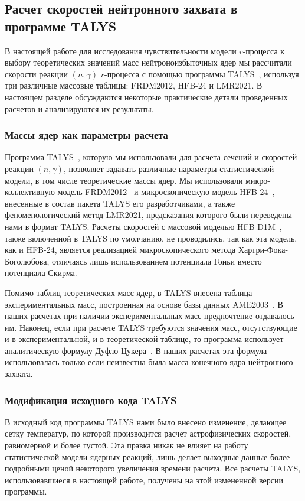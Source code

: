 \subsection{Расчет скоростей нейтронного захвата в программе TALYS}
В настоящей работе для исследования чувствительности модели $r$-процесса к выбору теоретических значений масс нейтроноизбыточных ядер мы рассчитали скорости реакции $(n,\gamma)$ $r$-процесса с помощью программы TALYS~\cite{koning2019}, используя три различные массовые таблицы: FRDM2012, HFB-24 и LMR2021. В настоящем разделе обсуждаются некоторые практические детали проведенных расчетов и анализируются их результаты.

\subsubsection{Массы ядер как параметры расчета}
Программа TALYS~\cite{koning2019}, которую мы использовали для расчета сечений и скоростей реакции $(n,\gamma)$, позволяет задавать различные параметры статистической модели, в том числе теоретические массы ядер. Мы использовали микро-коллективную модель FRDM2012~\cite{moller2016} и микроскопическую модель HFB-24~\cite{goriely2013}, внесенные в состав пакета TALYS его разработчиками, а также феноменологический метод LMR2021, предсказания которого были переведены нами в формат TALYS. Расчеты скоростей с массовой моделью HFB D1M~\cite{goriely2009}, также включенной в TALYS по умолчанию, не проводились, так как эта модель, как и HFB-24, является реализацией микроскопического метода Хартри-Фока-Боголюбова, отличаясь лишь использованием потенциала Гоньи вместо потенциала Скирма. 

Помимо таблиц теоретических масс ядер, в TALYS внесена таблица экспериментальных масс, построенная на основе базы данных AME2003~\cite{wapstra2003}. В наших расчетах при наличии экспериментальных масс предпочтение отдавалось им. Наконец, если при расчете TALYS требуются значения масс, отсутствующие и в экспериментальной, и в теоретической таблице, то программа использует аналитическую формулу Дуфло-Цукера~\cite{duflo1995}. В наших расчетах эта формула использовалась только если неизвестна была масса конечного ядра нейтронного захвата.

\subsubsection{Модификация исходного кода TALYS}
В исходный код программы TALYS нами было внесено изменение, делающее сетку температур, по которой производится расчет астрофизических скоростей, равномерной и более густой. Эта правка никак не влияет на работу статистической модели ядерных реакций, лишь делает выходные данные более подробными ценой некоторого увеличения времени расчета. Все расчеты TALYS, использовавшиеся в настоящей работе, получены на этой измененной версии программы.  

